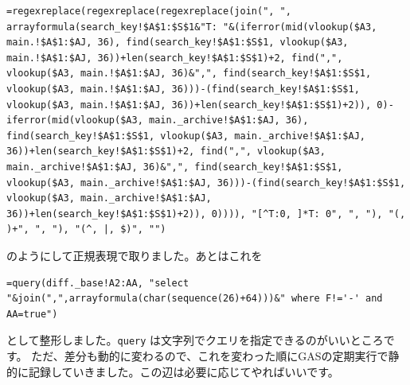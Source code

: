 \documentclass[dvipdfmx,jb5]{jreport}
\begin{document}
\begin{lstlisting}
=regexreplace(regexreplace(regexreplace(join(", ", arrayformula(search_key!$A$1:$S$1&"T: "&(iferror(mid(vlookup($A3, main.!$A$1:$AJ, 36), find(search_key!$A$1:$S$1, vlookup($A3, main.!$A$1:$AJ, 36))+len(search_key!$A$1:$S$1)+2, find(",", vlookup($A3, main.!$A$1:$AJ, 36)&",", find(search_key!$A$1:$S$1, vlookup($A3, main.!$A$1:$AJ, 36)))-(find(search_key!$A$1:$S$1, vlookup($A3, main.!$A$1:$AJ, 36))+len(search_key!$A$1:$S$1)+2)), 0)-iferror(mid(vlookup($A3, main._archive!$A$1:$AJ, 36), find(search_key!$A$1:$S$1, vlookup($A3, main._archive!$A$1:$AJ, 36))+len(search_key!$A$1:$S$1)+2, find(",", vlookup($A3, main._archive!$A$1:$AJ, 36)&",", find(search_key!$A$1:$S$1, vlookup($A3, main._archive!$A$1:$AJ, 36)))-(find(search_key!$A$1:$S$1, vlookup($A3, main._archive!$A$1:$AJ, 36))+len(search_key!$A$1:$S$1)+2)), 0)))), "[^T:0, ]*T: 0", ", "), "(, )+", ", "), "(^, |, $)", "")
\end{lstlisting}

のようにして正規表現で取りました。あとはこれを

\begin{lstlisting}
=query(diff._base!A2:AA, "select "&join(",",arrayformula(char(sequence(26)+64)))&" where F!='-' and AA=true")
\end{lstlisting}

として整形しました。\texttt{query} は文字列でクエリを指定できるのがいいところです。
ただ、差分も動的に変わるので、これを変わった順にGASの定期実行で静的に記録していきました。この辺は必要に応じてやればいいです。
\end{document}

